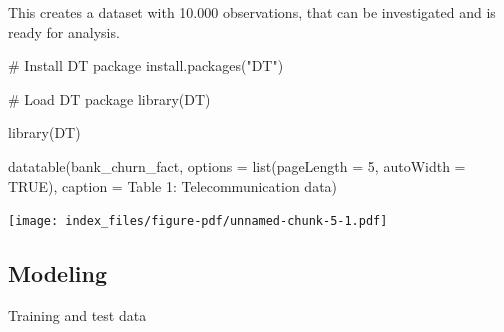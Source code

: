 \documentclass[
  letterpaper,
  DIV=11,
  numbers=noendperiod]{scrartcl}
\newenvironment{Shaded}{\begin{snugshade}}{\end{snugshade}}
\newcommand{\AttributeTok}[1]{\textcolor[rgb]{0.40,0.45,0.13}{#1}}
\newcommand{\CommentTok}[1]{\textcolor[rgb]{0.37,0.37,0.37}{#1}}
\newcommand{\ConstantTok}[1]{\textcolor[rgb]{0.56,0.35,0.01}{#1}}
\newcommand{\DecValTok}[1]{\textcolor[rgb]{0.68,0.00,0.00}{#1}}
\newcommand{\FloatTok}[1]{\textcolor[rgb]{0.68,0.00,0.00}{#1}}
\newcommand{\FunctionTok}[1]{\textcolor[rgb]{0.28,0.35,0.67}{#1}}
\newcommand{\NormalTok}[1]{\textcolor[rgb]{0.00,0.23,0.31}{#1}}
\newcommand{\OtherTok}[1]{\textcolor[rgb]{0.00,0.23,0.31}{#1}}
\newcommand{\SpecialCharTok}[1]{\textcolor[rgb]{0.37,0.37,0.37}{#1}}
\newcommand{\StringTok}[1]{\textcolor[rgb]{0.13,0.47,0.30}{#1}}
\begin{document}
This creates a dataset with 10.000 observations, that can be
investigated and is ready for analysis.

\begin{Shaded}
\begin{Highlighting}[]
\CommentTok{\# Install DT package}
\FunctionTok{install.packages}\NormalTok{(}\StringTok{"DT"}\NormalTok{)}

\CommentTok{\# Load DT package}
\FunctionTok{library}\NormalTok{(DT)}

\FunctionTok{library}\NormalTok{(DT)}

\FunctionTok{datatable}\NormalTok{(bank\_churn\_fact, }
          \AttributeTok{options =} \FunctionTok{list}\NormalTok{(}\AttributeTok{pageLength =} \DecValTok{5}\NormalTok{, }\AttributeTok{autoWidth =} \ConstantTok{TRUE}\NormalTok{), }
          \AttributeTok{caption =} \StringTok{\textquotesingle{}Table 1: Telecommunication data\textquotesingle{}}\NormalTok{)}
\end{Highlighting}
\end{Shaded}

\texttt{[image: index\_files/figure-pdf/unnamed-chunk-5-1.pdf]}

\subsection{Modeling}\label{modeling}

Training and test data

\begin{Shaded}
\end{Shaded}
\end{document}
